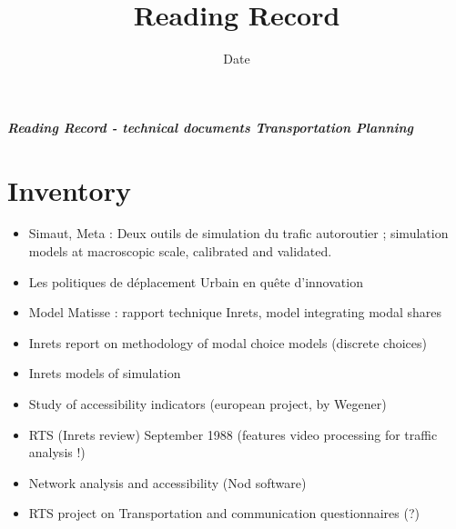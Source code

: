 


\title{Reading Record\bigskip\\
}
\author{}
\date{Date}


\maketitle

\textbf{\textit{Reading Record - technical documents Transportation Planning}}



\section{Inventory}


\begin{itemize}
\item Simaut, Meta : Deux outils de simulation du trafic autoroutier ; simulation models at macroscopic scale, calibrated and validated.
\item Les politiques de d{\'e}placement Urbain en qu{\^e}te d'innovation
\item Model Matisse : rapport technique Inrets, model integrating modal shares
\item Inrets report on methodology of modal choice models (discrete choices)
\item Inrets models of simulation
\item Study of accessibility indicators (european project, by Wegener)
\item RTS (Inrets review) September 1988 (features video processing for traffic analysis !)
\item Network analysis and accessibility (Nod software)
\item RTS project on Transportation and communication questionnaires (?)
\end{itemize}



















